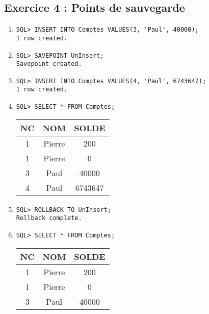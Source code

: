 \documentclass{article}
\begin{document}
\subsection*{Exercice 4 : Points de sauvegarde}

\begin{enumerate}[label=\arabic*)]
	\item
		\begin{lstlisting}
SQL> INSERT INTO Comptes VALUES(3, 'Paul', 40000);
1 row created.
		\end{lstlisting}

	\item
		\begin{lstlisting}
SQL> SAVEPOINT UnInsert;
Savepoint created.
		\end{lstlisting}

	\item 
		\begin{lstlisting}
SQL> INSERT INTO Comptes VALUES(4, 'Paul', 6743647);
1 row created.
		\end{lstlisting}

	\item
		\begin{lstlisting}
SQL> SELECT * FROM Comptes;
		\end{lstlisting}

\begin{tabular}{|c|c|c|}
	\hline
        	NC & NOM & SOLDE \\
	\hline        
 	1 & Pierre & 200 \\
	\hline         
	1 & Pierre & 0 \\
	\hline
	3 & Paul & 40000 \\
	\hline
	4 & Paul & 6743647 \\
	\hline
\end{tabular}

	\item
		\begin{lstlisting}
SQL> ROLLBACK TO UnInsert;
Rollback complete.
		\end{lstlisting}

	\item
		\begin{lstlisting}
SQL> SELECT * FROM Comptes;
		\end{lstlisting}

\begin{tabular}{|c|c|c|}
	\hline
        	NC & NOM & SOLDE \\
	\hline        
 	1 & Pierre & 200 \\
	\hline         
	1 & Pierre & 0 \\
	\hline
	3 & Paul & 40000 \\
	\hline
\end{tabular}
	

\end{enumerate}
\end{document}
